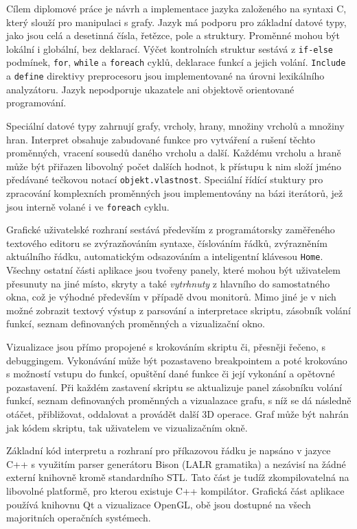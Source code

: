 \documentclass[11pt,twoside,a4paper]{book}
\begin{document}
Cílem diplomové práce je návrh a implementace jazyka založeného na syntaxi C, který slouží pro manipulaci s grafy. Jazyk má podporu pro základní datové typy, jako jsou celá a desetinná čísla, řetězce, pole a struktury. Proměnné mohou být lokální i globální, bez deklarací. Výčet kontrolních struktur sestává z \texttt{if-else} podmínek, \texttt{for}, \texttt{while} a \texttt{foreach} cyklů, deklarace funkcí a jejich volání. \texttt{Include} a \texttt{define} direktivy preprocesoru jsou implementované na úrovni lexikálního analyzátoru. Jazyk nepodporuje ukazatele ani objektově orientované programování.

Speciální datové typy zahrnují grafy, vrcholy, hrany, množiny vrcholů a množiny hran. Interpret obsahuje zabudované funkce pro vytváření a rušení těchto proměnných, vracení sousedů daného vrcholu a další. Každému vrcholu a hraně může být přiřazen libovolný počet dalších hodnot, k přístupu k nim složí jméno předávané tečkovou notací \texttt{objekt.vlastnost}. Speciální řídící stuktury pro zpracování komplexních proměnných jsou implementovány na bázi iterátorů, jež jsou interně volané i ve \texttt{foreach} cyklu.

Grafické uživatelské rozhraní sestává především z programátorsky zaměřeného textového editoru se zvýrazňováním syntaxe, číslováním řádků, zvýrazněním aktuálního řádku, automatickým odsazováním a inteligentní klávesou \texttt{Home}. Všechny ostatní části aplikace jsou tvořeny panely, které mohou být uživatelem přesunuty na jiné místo, skryty a také \textit{vytrhnuty} z hlavního do samostatného okna, což je výhodné především v případě dvou monitorů. Mimo jiné je v nich možné zobrazit textový výstup z parsování a interpretace skriptu, zásobník volání funkcí, seznam definovaných proměnných a vizualizační okno.

Vizualizace jsou přímo propojené s krokováním skriptu či, přesněji řečeno, s debuggingem. Vykonávání může být pozastaveno breakpointem a poté krokováno s možností vstupu do funkcí, opuštění dané funkce či její vykonání a opětovné pozastavení. Při každém zastavení skriptu se aktualizuje panel zásobníku volání funkcí, seznam definovaných proměnných a vizualazace grafu, s níž se dá následně otáčet, přibližovat, oddalovat a provádět další 3D operace. Graf může být nahrán jak kódem skriptu, tak uživatelem ve vizualizačním okně.

Základní kód interpretu a rozhraní pro příkazovou řádku je napsáno v jazyce C++ s využitím parser generátoru Bison (LALR gramatika) a nezávisí na žádné externí knihovně kromě standardního STL. Tato část je tudíž zkompilovatelná na libovolné platformě, pro kterou existuje C++ kompilátor. Grafická část aplikace používá knihovnu Qt a vizualizace OpenGL, obě jsou dostupné na všech majoritních operačních systémech.
\end{document}
